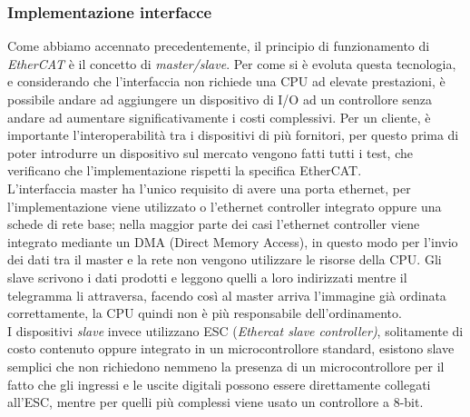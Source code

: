\subsubsection{Implementazione interfacce}
Come abbiamo accennato precedentemente, il principio di funzionamento di \textit{EtherCAT} è il concetto di \textit{master/slave}. Per come si è evoluta questa tecnologia, e considerando che l'interfaccia non richiede una CPU ad elevate prestazioni, è possibile andare ad aggiungere un dispositivo di I/O ad un controllore senza andare ad aumentare significativamente i costi complessivi. Per un cliente, è importante l'interoperabilità tra i dispositivi di più fornitori, per questo prima di poter introdurre un dispositivo sul mercato vengono fatti tutti i test, che verificano che l'implementazione rispetti la specifica EtherCAT.\\L'interfaccia master ha l'unico requisito di avere una porta ethernet, per l'implementazione viene utilizzato o l'ethernet controller integrato oppure una schede di rete base; nella maggior parte dei casi l'ethernet controller viene integrato mediante un DMA (Direct Memory Access), in questo modo per l'invio dei dati tra il master e la rete non vengono utilizzare le risorse della CPU. Gli slave scrivono i dati prodotti e leggono quelli a loro indirizzati mentre il telegramma li attraversa, facendo così al master arriva l'immagine già ordinata correttamente, la CPU quindi non è più responsabile dell'ordinamento.\\I dispositivi \textit{slave} invece utilizzano ESC (\textit{Ethercat slave controller)}, solitamente di costo contenuto oppure integrato in un microcontrollore standard, esistono slave semplici che non richiedono nemmeno la presenza di un microcontrollore per il fatto che gli ingressi e le uscite digitali possono essere direttamente collegati all'ESC, mentre per quelli più complessi viene usato un controllore a 8-bit.
